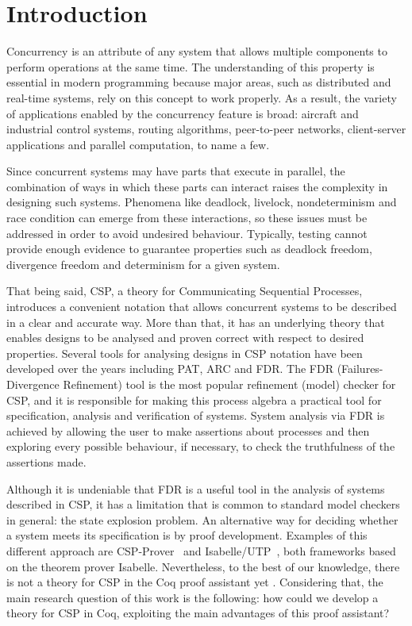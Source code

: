 \chapter{Introduction}
\label{chapter:introduction}

Concurrency is an attribute of any system that allows multiple components to perform operations at the same time. The understanding of this property is essential in modern programming because major areas, such as distributed and real-time systems, rely on this concept to work properly. As a result, the variety of applications enabled by the concurrency feature is broad: aircraft and industrial control systems, routing algorithms, peer-to-peer networks, client-server applications and parallel computation, to name a few.

Since concurrent systems may have parts that execute in parallel, the combination of ways in which these parts can interact raises the complexity in designing such systems. Phenomena like deadlock, livelock, nondeterminism and race condition can emerge from these interactions, so these issues must be addressed in order to avoid undesired behaviour. Typically, testing cannot provide enough evidence to guarantee properties such as deadlock freedom, divergence freedom and determinism for a given system.

That being said, CSP, a theory for Communicating Sequential Processes, introduces a convenient notation that allows concurrent systems to be described in a clear and accurate way. More than that, it has an underlying theory that enables designs to be analysed and proven correct with respect to desired properties. Several tools for analysing designs in CSP notation have been developed over the years including PAT, ARC and FDR. The FDR (Failures-Divergence Refinement) tool is the most popular refinement (model) checker for CSP, and it is responsible for making this process algebra a practical tool for specification, analysis and verification of systems. System analysis via FDR is achieved by allowing the user to make assertions about processes and then exploring every possible behaviour, if necessary, to check the truthfulness of the assertions made.

Although it is undeniable that FDR is a useful tool in the analysis of systems described in CSP, it has a limitation that is common to standard model checkers in general: the state explosion problem. An alternative way for deciding whether a system meets its specification is by proof development. Examples of this different approach are CSP-Prover~\cite{Roggenbach:CSP-Prover} and Isabelle/UTP~\cite{Woodcock:Isabelle/UTP}, both frameworks based on the theorem prover Isabelle. Nevertheless, to the best of our knowledge, there is not a theory for CSP in the Coq proof assistant yet \cite{bertot:coq}. Considering that, the main research question of this work is the following: how could we develop a theory for CSP in Coq, exploiting the main advantages of this proof assistant?

